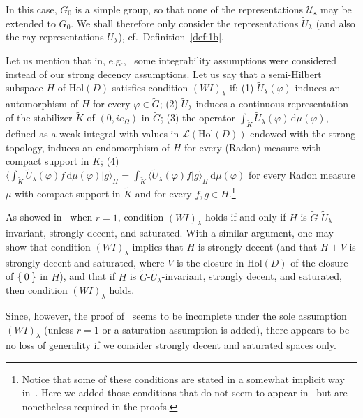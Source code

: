 \documentclass[10.5pt,reqno]{amsart}
\newcommand{\Hol}{\mathrm{Hol}}
\newcommand{\vect}[1]{\mathbf{{#1}}}
\newcommand{\dd}{\mathrm{d}}
\newcommand{\Uc}{\mathcal{U}}
\renewcommand{\phi}{\varphi}
\newcommand{\mi}{\mu}
\newcommand{\Lin}{\mathscr{L}}
\begin{document}
In this case, $G_0$ is a simple group, so that none of the representations $\Uc_{\vect s}$ may be extended to $G_0$. We shall therefore only consider the representations $\widetilde U_\lambda$ (and also the ray representations $U_\lambda$), cf.~Definition~\ref{def:1b}.


\begin{oss}\label{oss:1}
	Let us mention that in, e.g.,~\cite{ArazyFisher2,Arazy} some   integrability assumptions were considered instead of our strong decency assumptions. Let us say that a semi-Hilbert subspace $H$ of $\Hol(D)$ satisfies condition $(W\!I)_\lambda$ if: (1) $\widetilde U_\lambda(\phi)$ induces an automorphism of $H$ for every $\phi\in \widetilde G$; (2) $\widetilde U_\lambda$ induces a continuous representation of the stabilizer $\widetilde K$ of $(0,i e_\Omega)$ in $\widetilde G$; (3) the operator $\int_{\widetilde K} \widetilde U_\lambda(\phi)\,\dd \mi(\phi)$, defined as a weak integral with values in $\Lin(\Hol(D))$ endowed with the strong topology, induces an endomorphism of $H$ for every (Radon) measure with compact support in $\widetilde K$; (4) $\langle \int_{\widetilde K} \widetilde U_\lambda(\phi)f\,\dd \mi(\phi) \vert g \rangle_H=\int_{\widetilde K} \langle\widetilde U_\lambda(\phi)f\vert g\rangle_H\,\dd \mi(\phi)$ for every Radon measure $\mi$ with compact support in $\widetilde K$ and for every $f,g\in H$.\footnote{Notice that some of these conditions are stated in a somewhat implicit way in~\cite{ArazyFisher2,Arazy}. Here we added those conditions that do not seem to appear in~\cite{ArazyFisher2,Arazy} but are nonetheless required in the proofs.}
	
	As showed in~\cite[Propositions 2.14 and 6.2]{Rango1} when $r=1$, condition $(W\!I)_\lambda$ holds if and only if $H$ is $\widetilde G$-$\widetilde U_\lambda$-invariant, strongly decent, and saturated. With a similar argument, one may show that condition $(W\!I)_\lambda$ implies that $H$ is strongly decent (and that $H+V$ is strongly decent and saturated, where $V$ is the closure in $\Hol(D)$ of the closure of $\Set{0}$ in $H$), and that if $H$ is $\widetilde G$-$\widetilde U_\lambda$-invariant, strongly decent, and saturated, then condition $(W\!I)_\lambda$ holds.
	
	Since, however, the proof of~\cite[Theorems 5.2]{Arazy} seems to be incomplete under the sole assumption $(W\!I)_\lambda$ (unless $r=1$ or a saturation assumption is added), there appears to be no loss of generality if we consider strongly decent and saturated spaces only.
\end{oss}
\end{document}
